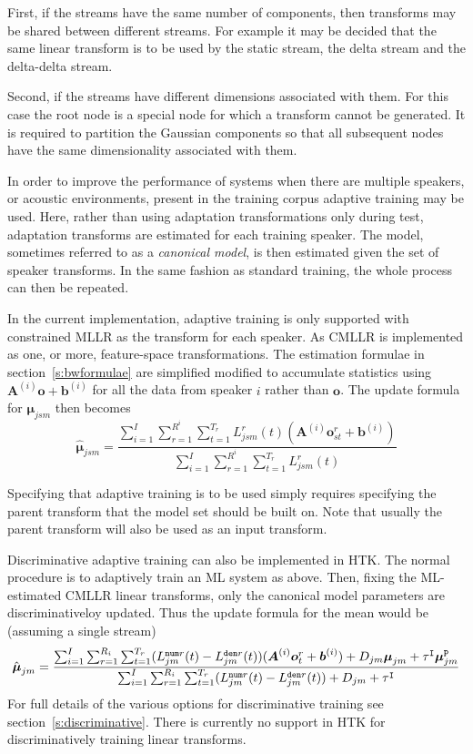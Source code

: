 First, if the streams have the same number of components, then transforms
may be shared between different streams. For example it may be decided that
the same linear transform is to be used by the static stream, the delta
stream and the delta-delta stream.

Second, if the streams have different dimensions associated with them. For
this case the root node is a special node for which a transform cannot be 
generated. It is required to partition the Gaussian components so that 
all subsequent nodes have the same dimensionality associated with them.


In order to improve the performance of systems when there are multiple
speakers, or acoustic environments, present in the training corpus 
adaptive training may be used. Here, rather than using adaptation
transformations only during test, adaptation transforms are estimated
for each training speaker. The model, sometimes referred to as a {\em canonical
model}, is then estimated given the set of speaker transforms. In the
same fashion as standard training, the whole process can then be repeated.

In the current implementation, adaptive training is only supported
with constrained MLLR as the transform for each speaker. As CMLLR is
implemented as one, or more, feature-space transformations. The
estimation formulae in section~\ref{s:bwformulae} are simplified
modified to accumulate statistics using
$\bm{A}^{(i)}\bm{o}+\bm{b}^{(i)}$ for all the data from speaker $i$
rather than $\bm{o}$. The update formula for $\bm{\mu}_{jsm}$ then
becomes
\newcommand{\satliksum}[1]{
                  \sum_{i=1}^I\sum_{r=1}^{R^i}  \sum_{t=1}^{T_r} L^r_{#1}(t)
}
\[
   \hat{\bm{\mu}}_{jsm} = \frac{
                \satliksum{jsm}(\bm{A}^{(i)}\bm{o}^r_{st}+\bm{b}^{(i)})}{\satliksum{jsm}}
\]

Specifying that adaptive training is to be used simply requires specifying
the parent transform that the model set should be built on. Note that usually
the parent transform will also be used as an input transform.

Discriminative adaptive training can also be implemented in HTK. The normal
procedure is to adaptively train an ML system as above. Then, fixing the
ML-estimated CMLLR linear transforms, only the canonical model parameters are
discriminativeloy updated. Thus the update formula for the mean would be
(assuming a single stream)
\newcommand{\liksumdiscs}[1]{
                  \sum_{i=1}^I\sum_{r=1}^{R_i}  \sum_{t=1}^{T_r} (L^{{\tt num}r}_{#1}(t) - L^{{\tt den}r}_{#1}(t))
}
\begin{eqnarray*}
\hat{\bm{\mu}}_{jm} = \frac{\liksumdiscs{jm}(\bm{A}^{(i)}\bm{o}^r_{t}+\bm{b}^{(i)}) + D_{jm}{\bm{\mu}}_{jm}
+ \tau^{\tt I}{\bm\mu}^{\tt p}_{jm}}
{\liksumdiscs{jm} + D_{jm} + \tau^{\tt I}}
\end{eqnarray*}
For full details of the various options for discriminative training see
section~\ref{s:discriminative}.   There is currently no support in HTK for
discriminatively training linear transforms.

